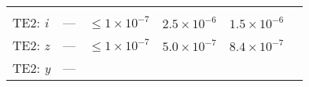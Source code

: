 \documentclass[DM, lsstdraft, toc]{lsstdoc}
\begin{document}
\begin{longtable}[]{@{}llllll@{}}
\begin{minipage}[t]{0.17\columnwidth}
\strut
\end{minipage}\tabularnewline
\begin{minipage}[t]{0.12\columnwidth}\raggedright\strut
TE2: \emph{i}\strut
\end{minipage} & \begin{minipage}[t]{0.06\columnwidth}\raggedright\strut
---\strut
\end{minipage} & \begin{minipage}[t]{0.14\columnwidth}\raggedright\strut
\(\leq 1\times10^{-7}\)\strut
\end{minipage} & \begin{minipage}[t]{0.12\columnwidth}\raggedright\strut
\(2.5\times10^{-6}\)\strut
\end{minipage} & \begin{minipage}[t]{0.12\columnwidth}\raggedright\strut
\(1.5\times10^{-6}\)\strut
\end{minipage} & \begin{minipage}[t]{0.17\columnwidth}\raggedright\strut
\strut
\end{minipage}\tabularnewline
\begin{minipage}[t]{0.12\columnwidth}\raggedright\strut
TE2: \emph{z}\strut
\end{minipage} & \begin{minipage}[t]{0.06\columnwidth}\raggedright\strut
---\strut
\end{minipage} & \begin{minipage}[t]{0.14\columnwidth}\raggedright\strut
\(\leq 1\times10^{-7}\)\strut
\end{minipage} & \begin{minipage}[t]{0.12\columnwidth}\raggedright\strut
\(5.0\times10^{-7}\)\strut
\end{minipage} & \begin{minipage}[t]{0.12\columnwidth}\raggedright\strut
\(8.4\times10^{-7}\)\strut
\end{minipage} & \begin{minipage}[t]{0.17\columnwidth}\raggedright\strut
\strut
\end{minipage}\tabularnewline
\begin{minipage}[t]{0.12\columnwidth}\raggedright\strut
TE2: \emph{y}\strut
\end{minipage} & \begin{minipage}[t]{0.06\columnwidth}\raggedright\strut
---\strut
\end{minipage} & \begin{minipage}[t]{0.14\columnwidth}\raggedright\strut

\end{minipage}
\end{longtable}
\end{document}
